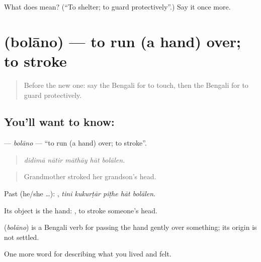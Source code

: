 \begin{tcolorbox}[breakable,colback=teal!4,colframe=teal!35!black,title={Before you move on}]
What does  mean? (\textquotedblleft{}To shelter; to guard protectively\textquotedblright{}.) Say it once more.
\end{tcolorbox}
\section[\texorpdfstring{\bn{বোলানো} (bolāno)}{বোলানো (bolāno)}]{ (bolāno) — to run (a hand) over; to stroke}

\label{lesson:BN-C487-bolano}



\begin{quote}
Before the new one: say the Bengali for to touch, then the Bengali for to guard protectively.
\end{quote}

\subsection*{You'll want to know: }
\textbf{} — \emph{bolāno} — \textquotedblleft{}to run (a hand) over; to stroke\textquotedblright{}.

\begin{quote}
    
\end{quote}

\begin{quote}
\emph{didimā nātir māthāy hāt bolālen.}
\end{quote}

\begin{quote}
Grandmother stroked her grandson's head.
\end{quote}

Past (he/she …):     , \emph{tini kukurṭār piṭhe hāt bolālen}.

Its object is the hand:   , to stroke someone's head.

\begin{cousinweb}
\textbf{} (\emph{bolāno}) is a Bengali verb for passing the hand gently over something; its origin is not settled.
\end{cousinweb}

\begin{grammarlens}[title={What you've built}]
One more word for describing what you lived and felt.
\end{grammarlens}

